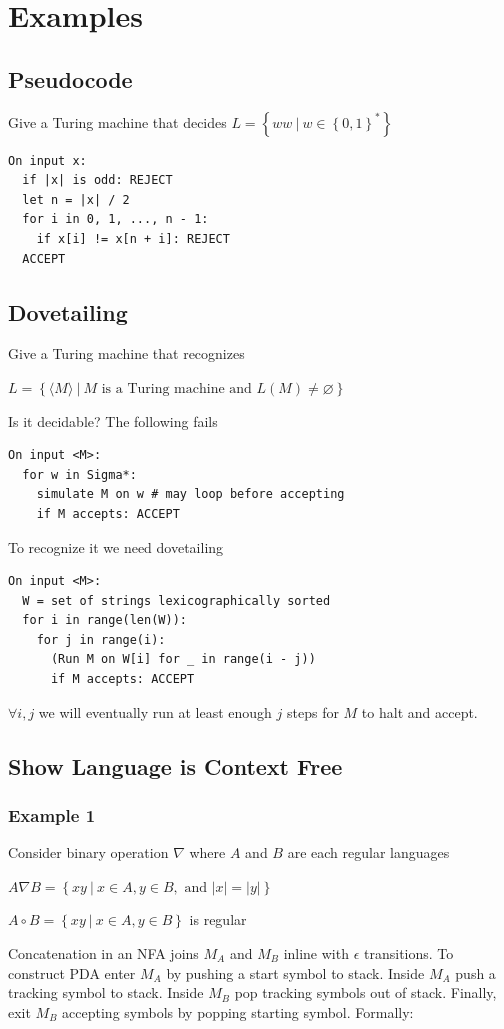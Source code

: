 \section{Examples}
\subsection{Pseudocode}
Give a Turing machine that decides $L = \left\{ww ~|~ w\in \left\{0, 1\right\}^\ast\right\}$
\begin{verbatim}
On input x:
  if |x| is odd: REJECT
  let n = |x| / 2
  for i in 0, 1, ..., n - 1:
    if x[i] != x[n + i]: REJECT
  ACCEPT
\end{verbatim}
\subsection{Dovetailing}
Give a Turing machine that recognizes

\hspace{5mm}$L = \left\{\langle M \rangle ~|~ M \textrm{ is a Turing machine and } L(M) \neq \varnothing\right\}$

Is it decidable? The following fails
\begin{verbatim}
On input <M>:
  for w in Sigma*:
    simulate M on w # may loop before accepting
    if M accepts: ACCEPT
\end{verbatim}
To recognize it we need dovetailing
\begin{verbatim}
On input <M>:
  W = set of strings lexicographically sorted
  for i in range(len(W)):
    for j in range(i):
      (Run M on W[i] for _ in range(i - j))
      if M accepts: ACCEPT
\end{verbatim}
$\forall i, j$ we will eventually run at least enough $j$ steps for $M$
to halt and accept.
\subsection{Show Language is Context Free}
\subsubsection{Example 1}
Consider binary operation $\nabla$ where $A$ and $B$ are each regular
languages

$A\nabla B = \left\{xy ~|~ x \in A, y \in B, \textrm{ and } |x| = |y|\right\}$

$A \circ B = \left\{ xy ~|~ x \in A, y \in B\right\}$ is regular

Concatenation in an NFA joins $M_A$ and $M_B$ inline with $\epsilon$
transitions. To construct PDA enter $M_A$ by pushing a start symbol to
stack. Inside $M_A$ push a tracking symbol to stack. Inside $M_B$ pop
tracking symbols out of stack. Finally, exit $M_B$ accepting symbols by
popping starting symbol. Formally:

